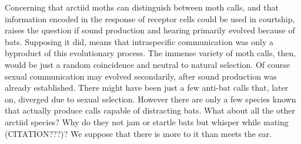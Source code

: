 \documentclass[12pt,a4paper]{article}
\begin{document}
Concerning that arctiid moths can distinguish between moth calls, and that information encoded in the response of receptor cells could be used in courtship, raises the question if sound production and hearing primarily evolved because of bats. Supposing it did, means that intraspecific communication was only a byproduct of this evolutionary process. The immense variety of moth calls, then, would be just a random coincidence and neutral to natural selection. Of course sexual communication may evolved secondarily, after sound production was already established. There might have been just a few anti-bat calls that, later on, diverged due to sexual selection. However there are only a few species known that actually produce calls capable of distracting bats. What about all the other arctiid species? Why do they not jam or startle bats but whisper while mating (CITATION???)? We suppose that there is more to it than meets the ear. 




\newpage
% 
% 
\printbibliography
\end{document}
